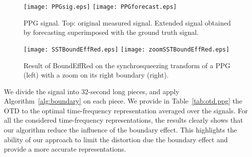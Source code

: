 \begin{figure}
\texttt{[image: PPGsig.eps]}
\texttt{[image: PPGforecast.eps]}
\caption{PPG signal. Top: original measured signal. Extended signal obtained by forecasting superimposed with the ground truth signal.}
\label{fig:ppg}
\end{figure}

\begin{figure}
\texttt{[image: SSTBoundEffRed.eps]}
\texttt{[image: zoomSSTBoundEffRed.eps]}
\caption{Result of {\sf BoundEffRed} on the synchrosqueezing transform of a PPG (left) with a zoom on its right boundary (right). }
\label{fig:ppg.boundeffred}
\end{figure}


We divide the signal into 32-second long pieces, and apply Algorithm~\ref{alg:boundary} on each piece. We provide in Table~\ref{tab:otd.ppg} the OTD to the optimal time-frequency representation averaged over the signals. For all the considered time-frequency representations, the results clearly shows that our algorithm reduce the influence of the boundary effect. This highlights the ability of our approach to limit the distortion due the boundary effect and provide a more accurate representations.

